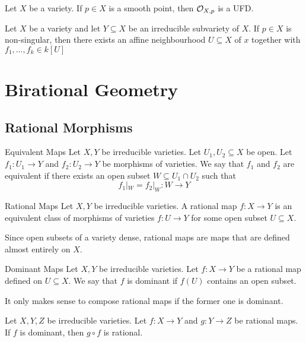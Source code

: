 \documentclass[a4paper]{article}
\begin{document}
\begin{prp}{}{} Let $X$ be a variety. If $p\in X$ is a smooth point, then $\mathcal{O}_{X,p}$ is a UFD. 
\end{prp}

\begin{prp}{}{} Let $X$ be a variety and let $Y\subseteq X$ be an irreducible subvariety of $X$. If $p\in X$ is non-singular, then there exists an affine neighbourhood $U\subseteq X$ of $x$ together with $f_1,\dots,f_k\in k[U]$
\end{prp}

\pagebreak
\section{Birational Geometry}
\subsection{Rational Morphisms}
\begin{defn}{Equivalent Maps}{} Let $X,Y$ be irreducible varieties. Let $U_1,U_2\subseteq X$ be open. Let $f_1:U_1\to Y$ and $f_2:U_2\to Y$ be morphisms of varieties. We say that $f_1$ and $f_2$ are equivalent if there exists an open subset $W\subseteq U_1\cap U_2$ such that $$f_1|_W=f_2|_W:W\to Y$$
\end{defn}

\begin{defn}{Rational Maps}{} Let $X,Y$ be irreducible varieties. A rational map $f:X\to Y$ is an equivalent class of morphisms of varieties $f:U\to Y$ for some open subset $U\subseteq X$. 
\end{defn}

Since open subsets of a variety dense, rational maps are maps that are defined almost entirely on $X$. 

\begin{defn}{Dominant Maps}{} Let $X,Y$ be irreducible varieties. Let $f:X\to Y$ be a rational map defined on $U\subseteq X$. We say that $f$ is dominant if $f(U)$ contains an open subset. 
\end{defn}

It only makes sense to compose rational maps if the former one is dominant. 

\begin{prp}{}{} Let $X,Y,Z$ be irreducible varieties. Let $f:X\to Y$ and $g:Y\to Z$ be rational maps. If $f$ is dominant, then $g\circ f$ is rational. 
\end{prp}
\end{document}
